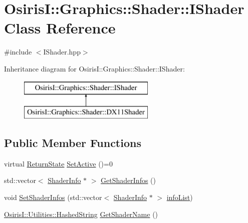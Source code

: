 \hypertarget{class_osiris_i_1_1_graphics_1_1_shader_1_1_i_shader}{\section{Osiris\-I\-:\-:Graphics\-:\-:Shader\-:\-:I\-Shader Class Reference}
\label{class_osiris_i_1_1_graphics_1_1_shader_1_1_i_shader}
}


{\ttfamily \#include $<$I\-Shader.\-hpp$>$}

Inheritance diagram for Osiris\-I\-:\-:Graphics\-:\-:Shader\-:\-:I\-Shader\-:\begin{figure}[H]
\begin{center}
\leavevmode
\includegraphics[height=2.000000cm]{class_osiris_i_1_1_graphics_1_1_shader_1_1_i_shader}
\end{center}
\end{figure}
\subsection*{Public Member Functions}
\begin{DoxyCompactItemize}
\item 
virtual \hyperlink{namespace_osiris_i_a8f53bf938dc75c65c6a529694514013e}{Return\-State} \hyperlink{class_osiris_i_1_1_graphics_1_1_shader_1_1_i_shader_a0c443cfb8d2dc86809959798469c6db4}{Set\-Active} ()=0
\item 
std\-::vector$<$ \hyperlink{struct_osiris_i_1_1_graphics_1_1_shader_1_1_shader_info}{Shader\-Info} $\ast$ $>$ \hyperlink{class_osiris_i_1_1_graphics_1_1_shader_1_1_i_shader_a811fcd6d9ea448f164770d4417b668fd}{Get\-Shader\-Infos} ()
\item 
void \hyperlink{class_osiris_i_1_1_graphics_1_1_shader_1_1_i_shader_afaced99478dd492725b5e9e1f4841d44}{Set\-Shader\-Infos} (std\-::vector$<$ \hyperlink{struct_osiris_i_1_1_graphics_1_1_shader_1_1_shader_info}{Shader\-Info} $\ast$ $>$ \hyperlink{class_osiris_i_1_1_graphics_1_1_shader_1_1_i_shader_a6620a0e6eab9ce30f098375f8da41761}{info\-List})
\item 
\hyperlink{class_osiris_i_1_1_utilities_1_1_hashed_string}{Osiris\-I\-::\-Utilities\-::\-Hashed\-String} \hyperlink{class_osiris_i_1_1_graphics_1_1_shader_1_1_i_shader_a374221e853eeb6d52b8f191c10182b7e}{Get\-Shader\-Name} ()
\end{DoxyCompactItemize}
